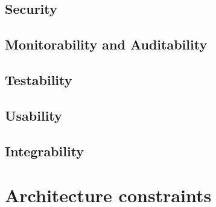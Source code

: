 \documentclass[a4paper,11pt]{article}
\begin{document}
\subsection{Security}
\subsection{Monitorability and Auditability}
\subsection{Testability}
\subsection{Usability}
\subsection{Integrability}

\section{Architecture constraints}
\end{document}
